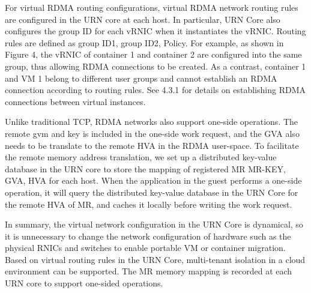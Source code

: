 For virtual RDMA routing configurations, virtual RDMA network routing rules are configured in the URN core at each host. In particular, URN Core also configures the group ID for each vRNIC when it instantiates the vRNIC. Routing rules are defined as {group ID1, group ID2, Policy}. For example, as shown in Figure 4, the vRNIC of container 1 and container 2 are configured into the same group, thus allowing RDMA connections to be created. As a contrast, container 1 and VM 1 belong to different user groups and cannot establish an RDMA connection according to routing rules. See 4.3.1 for details on establishing RDMA connections between virtual instances.

Unlike traditional TCP, RDMA networks also support one-side operations. The remote gvm and key is included in the one-side work request, and the GVA also needs to be translate to the remote HVA in the RDMA user-space. To facilitate the remote memory address translation, we set up a distributed key-value database in the URN core to store the mapping of registered MR {MR-KEY, GVA, HVA} for each host. When the application in the guest performs a one-side operation, it will query the distributed key-value database in the URN Core for the remote HVA of MR, and caches it locally before writing the work request.

In summary, the virtual network configuration in the URN Core is dynamical, so it is unnecessary to change the network configuration of hardware such as the physical RNICs and switches to enable portable VM or container migration. Based on virtual routing rules in the URN Core, multi-tenant isolation in a cloud environment can be supported. The MR memory mapping is recorded at each URN core to support one-sided operations.

